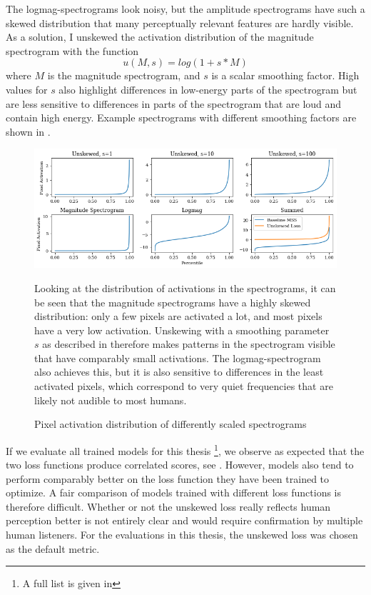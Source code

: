 The logmag-spectrograms look noisy, but the amplitude spectrograms have such a skewed distribution that many perceptually relevant features are hardly visible. As a solution, I unskewed the activation distribution of the magnitude spectrogram with the function
\begin{equation}
    \label{eq:unskew}
u(M, s) = log(1 + s * M)
\end{equation}
where $M$ is the magnitude spectrogram, and $s$ is a scalar smoothing factor.
High values for $s$ also highlight differences in low-energy parts of the spectrogram but are less sensitive to differences in parts of the spectrogram that are loud and contain high energy. Example spectrograms with different smoothing factors are shown in .
\begin{figure}
    \centering
    \includegraphics[width=\textwidth]{figures/mss/unskewing.png}
    \caption{Pixel activation distribution of differently scaled spectrograms}
    \small{Looking at the distribution of activations in the spectrograms, it can be seen that the magnitude spectrograms have a highly skewed distribution: only a few pixels are activated a lot, and most pixels have a very low activation. Unskewing with a smoothing parameter $s$ as described in  therefore makes patterns in the spectrogram visible that have comparably small activations. The logmag-spectrogram also achieves this, but it is also sensitive to differences in the least activated pixels, which correspond to very quiet frequencies that are likely not audible to most humans.}
    \label{fig:smoothing}
\end{figure}

If we evaluate all trained models for this thesis \footnote{A full list is given in }, we observe as expected that the two loss functions produce correlated scores, see .
However, models also tend to perform comparably better on the loss function they have been trained to optimize.
A fair comparison of models trained with different loss functions is therefore difficult.
Whether or not the unskewed loss really reflects human perception better is not entirely clear and would require confirmation by multiple human listeners. For the evaluations in this thesis, the unskewed loss was chosen as the default metric.

